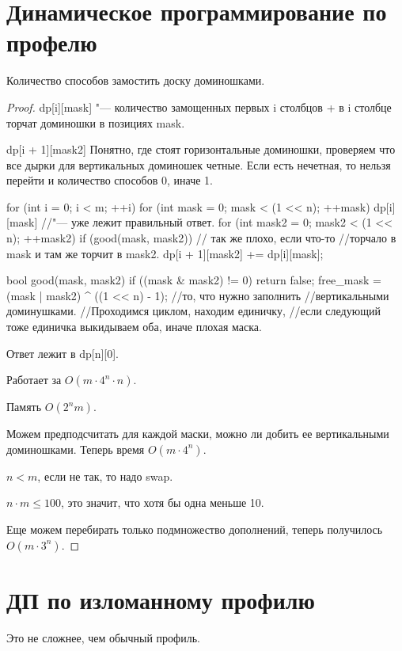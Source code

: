 \section{Динамическое программирование по профелю}
Количество способов замостить доску доминошками. 
\begin{proof}
dp[i][mask] "--- количество замощенных первых i столбцов + в i столбце торчат доминошки в позициях mask.

dp[i + 1][mask2] Понятно, где стоят горизонтальные доминошки, проверяем что все дырки для вертикальных доминошек четные. 
Если есть нечетная, то нельзя перейти и количество способов 0, иначе 1. 

\begin{cppcode}
for (int i = 0; i < m; ++i) {
    for (int mask = 0; mask < (1 << n); ++mask) {
        dp[i][mask] //"--- уже лежит правильный ответ. 
        for (int mask2 = 0; mask2 < (1 << n); ++mask2) { 
            if (good(mask, mask2)) { 
                // так же плохо, если что-то 
                //торчало в mask и там же торчит в mask2.
                dp[i + 1][mask2] += dp[i][mask];
            } 
        }
    }
}

bool good(mask, mask2) {
    if ((mask & mask2) != 0) return false;
    free_mask = (mask | mask2) ^ ((1 << n) - 1); //то, что нужно заполнить 
    //вертикальными доминушками.
    //Проходимся циклом, находим единичку, 
    //если следующий тоже единичка выкидываем оба, иначе плохая маска.   
}
\end{cppcode}

Ответ лежит в dp[n][0].

Работает за $O(m \cdot 4^n \cdot n)$.

Память $O(2^n m)$.

Можем предподсчитать для каждой маски, можно ли добить ее вертикальными доминошками. 
Теперь время $O(m \cdot 4^n)$.

\begin{Rem}
$n < m$, если не так, то надо swap.

$n \cdot m \le 100$, это значит, что хотя бы одна меньше 10.
\end{Rem} 

Еще можем перебирать только подмножество дополнений, теперь получилось $O(m \cdot 3^{n})$.
\end{proof}
\section{ДП по изломанному профилю}
Это не сложнее, чем обычный профиль.

